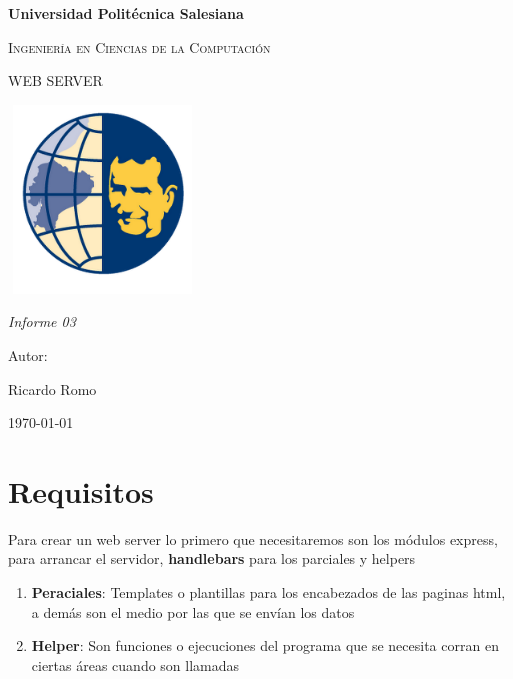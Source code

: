 \documentclass{report}
\begin{document}
\begin{titlepage}
    \centering
    {\bfseries\LARGE Universidad Politécnica Salesiana \par}
    \vspace{1cm}
    {\scshape\Large Ingeniería en Ciencias de la Computación \par}
    \vspace{3cm}
    {\scshape\Huge WEB SERVER \par}
    \vspace{1cm}
    {\center\includegraphics[width=5cm, height=5cm]{ups1.png}\\}
    \vspace{1cm}
    {\itshape\Large Informe 03 \par}
    \vfill
    {\Large Autor: \par}
    {\Large Ricardo Romo \par}
    \vfill
    {\Large \today \par}
    \end{titlepage} 

    \section{Requisitos}
    Para crear un web server lo primero que necesitaremos son los módulos express, para arrancar el servidor,
    \textbf{handlebars} para los parciales y helpers
    \begin{enumerate}
      \item \textbf{Peraciales}: Templates o plantillas para los encabezados de las paginas html, a demás son el medio por las que se envían los datos
      \item \textbf{Helper}: Son funciones o ejecuciones del programa que se necesita corran en ciertas áreas cuando son llamadas
      
    \end{enumerate}
    
\end{document}
